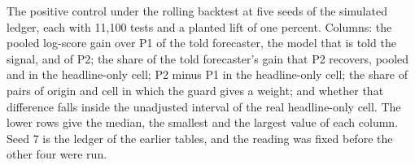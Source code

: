 \begin{table}[t]\centering\scriptsize
\caption{The positive control under the rolling backtest at five seeds of the simulated ledger, each with 11,100 tests and a planted lift of one percent. Columns: the pooled log-score gain over P1 of the told forecaster, the model that is told the signal, and of P2; the share of the told forecaster's gain that P2 recovers, pooled and in the headline-only cell; P2 minus P1 in the headline-only cell; the share of pairs of origin and cell in which the guard gives a weight; and whether that difference falls inside the unadjusted interval of the real headline-only cell. The lower rows give the median, the smallest and the largest value of each column. Seed 7 is the ledger of the earlier tables, and the reading was fixed before the other four were run.}
\label{tab:fmt-control-seeds}
\resizebox{\columnwidth}{!}{}
\end{table}

